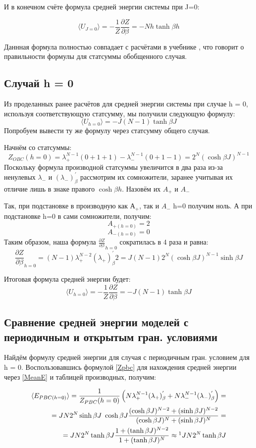 \documentclass{article}
\newcommand{\bj}{\beta J}
\newcommand{\bh}{\beta h}
\newcommand{\lp}{\lambda_{+}}
\newcommand{\lm}{\lambda_{-}}
\newcommand{\pbc}{_{PBC}}
\newcommand{\obc}{_{OBC}}
\newcommand{\dzdb}{\frac{\partial Z}{\partial \beta}}
\newcommand{\prpb}{^{'}_{\beta}}
\newcommand{\la}{\langle}
\newcommand{\ra}{\rangle}
\numberwithin{equation}{section}
\begin{document}
И в конечном счёте формула средней энергии системы при J=0: 

\[\langle U_{J = 0} \rangle = - \frac{1}{Z} \dzdb = - N h\tanh{\bh}\]

Даннная формула полностью совпадает с расчётами в учебнике \cite{Swen}, что говорит о правильности формулы для статсуммы обобщенного случая.

\subsection{Случай h = 0}

Из проделанных ранее расчётов для средней энергии системы при случае h = 0, используя соответствующую статсумму, мы получили следующую формулу:
\[ \langle U_{h = 0} \rangle = - J(N - 1)\tanh{\bj} \]
Попробуем вывести ту же формулу через статсумму общего случая.

Начнём со статсуммы:
\[ Z\obc(h=0) = \lp^{N-1}(0 + 1 + 1) - \lm^{N-1}(0 + 1 - 1) = 2^{N}(\cosh{\bj})^{N-1}\]
Поскольку формула производной статсуммы увеличится в два раза из-за ненулевых $\lm$ и $(\lm)^{'}_{\beta}$ рассмотрим их сомножители, заранее учитывая их отличие лишь в знаке правого $\cosh{\bh}$. Назовём их $A_{+}$ и $A_{-}$

Так, при подстановке в производную как $А_{+}$, так и $A_{-}$  h=0 получим ноль. А при подстановке h=0 в сами сомножители, получим:
\[A_{+(h=0)} = 2\]
\[A_{-(h=0)} = 0\]
Таким образом, наша формула $\dzdb_{h=0}$ сократилась в 4 раза и равна:
\[ \dzdb_{h=0} = (N-1)\lp^{N-2}(\lp)^{'}_{\beta}2 = J(N-1)2^{N}(\cosh{\bj})^{N-1}\sinh{\bj}\]

Итоговая формула средней энергии будет:
\[ \langle U_{h=0} \rangle = - \frac{1}{Z} \dzdb = - J (N - 1) \tanh{\bj}\]

\subsection{Сравнение средней энергии моделей с периодичным и открытым гран. условиями}

Найдём формулу средней энергии для случая с периодичным гран. условием для h = 0. Воспользовавшись формулой \eqref{Zpbc} для нахождения средней энергии через \eqref{MeanE} и таблицей производных, получим:

\begin{align*}
    \la E_{PBC (h = 0)} \ra = \frac{1}{Z\pbc(h = 0)}\left(N\lp^{N-1}(\lp)\prpb + N\lm^{N-1}(\lm)\prpb \right) = \\
    = JN2^{N}\sinh{\bj}\ \cosh{\bj} \frac{(\cosh{\bj})^{N-2} + (\sinh{\bj})^{N-2}}{(\cosh{\bj})^{N} + (\sinh{\bj})^{N}} = \\
    = JN2^{N} \tanh{\bj} \frac{1 + (\tanh{\bj})^{N-2}}{1 + (\tanh{\bj})^{N}} \approx \footnotemark JN2^{N} \tanh{\bj}
\end{align*}
\end{document}
